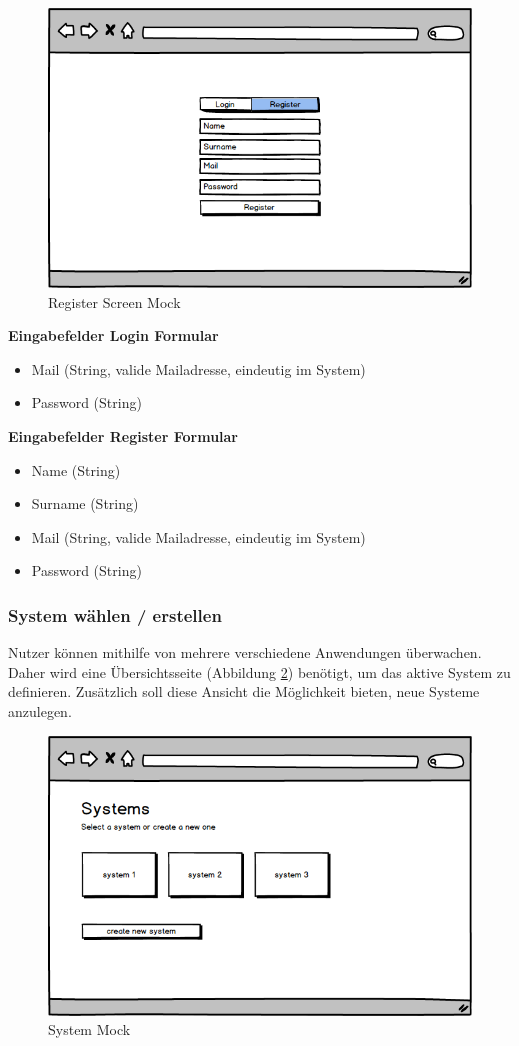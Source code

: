 \begin{figure}[h]
 \centering
 \includegraphics[width=0.7\linewidth]{kapitel1/mocks/Register.png}
 \caption{Register Screen Mock}
  \label{fig:register}
\end{figure}


\textbf{Eingabefelder Login Formular}
\begin{itemize}
\item Mail (String, valide Mailadresse, eindeutig im System)
\item Password (String)
\end{itemize}

\textbf{Eingabefelder Register Formular}
\begin{itemize}
\item Name (String)
\item Surname (String)
\item Mail (String, valide Mailadresse, eindeutig im System)
\item Password (String)
\end{itemize}



\subsubsection{System wählen / erstellen}

Nutzer können mithilfe von \projectname{} mehrere verschiedene Anwendungen überwachen.
Daher wird eine Übersichtsseite (Abbildung \ref{fig:system-picker}) benötigt,
um das aktive System zu definieren. Zusätzlich soll diese Ansicht die Möglichkeit bieten, neue Systeme anzulegen.

\vspace{0.3cm}

\begin{figure}[h]
 \centering
 \includegraphics[width=0.6\linewidth]{kapitel1/mocks/system-picker.png}
 \caption{System Mock}
 \label{fig:system-picker}
\end{figure}

